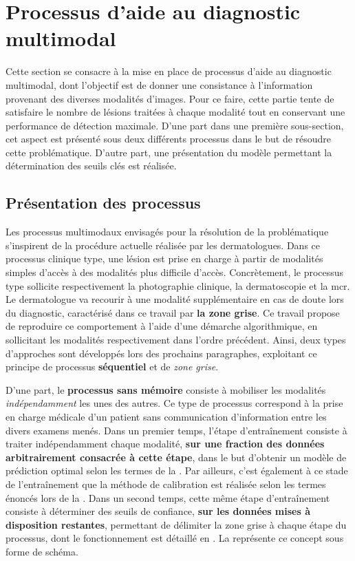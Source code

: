 \section{Processus d'aide au diagnostic multimodal}
Cette section se consacre à la mise en place de processus d'aide au diagnostic multimodal, dont l'objectif est de donner une consistance à l'information provenant des diverses modalités d'images. Pour ce faire, cette partie tente de satisfaire
le nombre de lésions traitées à chaque modalité tout en conservant une performance de détection maximale. D'une part dans une première sous-section, cet aspect est présenté sous deux différents processus dans le but de résoudre cette problématique. D'autre part, une présentation du modèle permettant la détermination des seuils clés est réalisée.

\subsection{Présentation des processus}
Les processus multimodaux envisagés pour la résolution de la problématique s'inspirent de la procédure actuelle réalisée par les dermatologues. Dans ce processus clinique type, une lésion est prise en charge à partir de modalités simples d'accès à des modalités plus difficile d'accès. Concrètement, le processus type sollicite respectivement la photographie clinique, la dermatoscopie et la \gls{mcr}. Le dermatologue va recourir à une modalité supplémentaire en cas de doute lors du diagnostic, caractérisé dans ce travail par \textbf{la zone grise}. Ce travail propose de reproduire ce comportement à l'aide d'une démarche algorithmique, en sollicitant les modalités respectivement dans l'ordre précédent. Ainsi, deux types d'approches sont développés lors des prochains paragraphes, exploitant ce principe de processus \textbf{séquentiel} et de \textit{zone grise}.\par

D'une part, le \textbf{processus sans mémoire} consiste à mobiliser les modalités \textit{indépendamment} les unes des autres. Ce type de processus correspond à la prise en charge médicale d'un patient sans communication d'information entre les divers examens menés. Dans un premier temps, l'étape d'entraînement consiste à traiter indépendamment chaque modalité, \textbf{sur une fraction des données arbitrairement consacrée à cette étape}, dans le but d'obtenir un modèle de prédiction optimal selon les termes de la . Par ailleurs, c'est également à ce stade de l'entraînement que la méthode de calibration est réalisée selon les termes énoncés lors de la . Dans un second temps, cette même étape d'entraînement consiste à déterminer des seuils de confiance, \textbf{sur les données mises à disposition restantes}, permettant de délimiter la zone grise à chaque étape du processus, dont le fonctionnement est détaillé en . La  représente ce concept sous forme de schéma.\par

